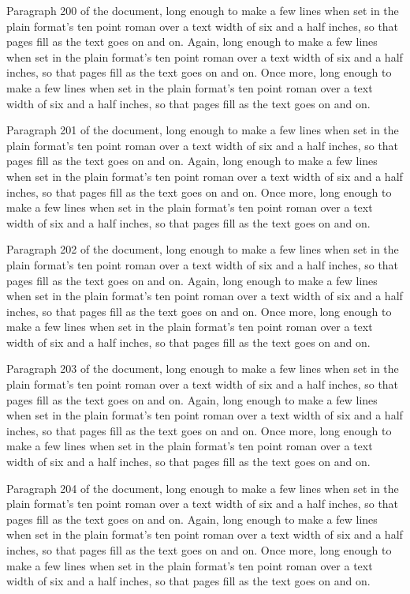 Paragraph 200 of the document, long enough to make a few lines when set in the plain format's ten point roman over a text width of six and a half inches, so that pages fill as the text goes on and on. Again, long enough to make a few lines when set in the plain format's ten point roman over a text width of six and a half inches, so that pages fill as the text goes on and on. Once more, long enough to make a few lines when set in the plain format's ten point roman over a text width of six and a half inches, so that pages fill as the text goes on and on.

Paragraph 201 of the document, long enough to make a few lines when set in the plain format's ten point roman over a text width of six and a half inches, so that pages fill as the text goes on and on. Again, long enough to make a few lines when set in the plain format's ten point roman over a text width of six and a half inches, so that pages fill as the text goes on and on. Once more, long enough to make a few lines when set in the plain format's ten point roman over a text width of six and a half inches, so that pages fill as the text goes on and on.

Paragraph 202 of the document, long enough to make a few lines when set in the plain format's ten point roman over a text width of six and a half inches, so that pages fill as the text goes on and on. Again, long enough to make a few lines when set in the plain format's ten point roman over a text width of six and a half inches, so that pages fill as the text goes on and on. Once more, long enough to make a few lines when set in the plain format's ten point roman over a text width of six and a half inches, so that pages fill as the text goes on and on.

Paragraph 203 of the document, long enough to make a few lines when set in the plain format's ten point roman over a text width of six and a half inches, so that pages fill as the text goes on and on. Again, long enough to make a few lines when set in the plain format's ten point roman over a text width of six and a half inches, so that pages fill as the text goes on and on. Once more, long enough to make a few lines when set in the plain format's ten point roman over a text width of six and a half inches, so that pages fill as the text goes on and on.

Paragraph 204 of the document, long enough to make a few lines when set in the plain format's ten point roman over a text width of six and a half inches, so that pages fill as the text goes on and on. Again, long enough to make a few lines when set in the plain format's ten point roman over a text width of six and a half inches, so that pages fill as the text goes on and on. Once more, long enough to make a few lines when set in the plain format's ten point roman over a text width of six and a half inches, so that pages fill as the text goes on and on.

